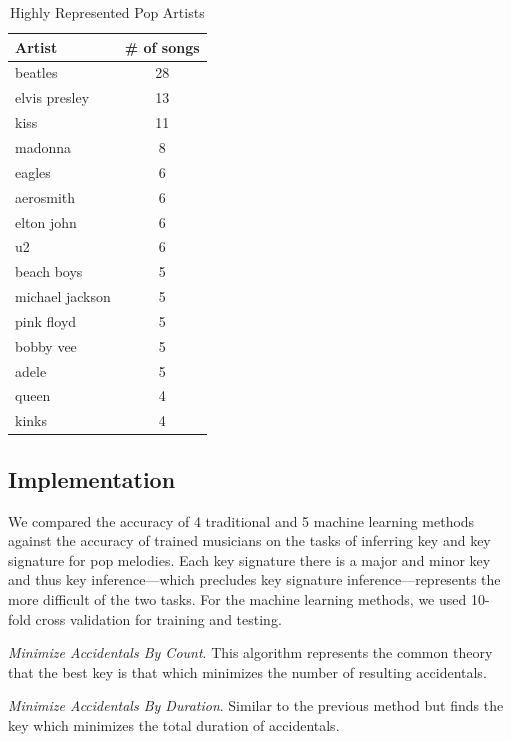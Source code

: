 \documentclass[letterpaper]{article}
\begin{document}
\begin{table}[]
\centering
\caption{Highly Represented Pop Artists}
\label{tab:data_summary}
\begin{tabular}{@{}lc@{}}
\toprule
Artist & \# of songs\\ \midrule
beatles	& 28 \\
elvis presley	& 13 \\
kiss	&	11 \\
madonna	&	8 \\
eagles	&	6 \\
aerosmith	&	6 \\
elton john	&	6 \\
u2	&	6 \\
beach boys	&	5 \\
michael jackson	&	5 \\
pink floyd	&	5 \\
bobby vee		&	5 \\
adele	&	5 \\
queen	&	4 \\
kinks		&	4 \\
\end{tabular}
\end{table}

\subsection{Implementation}

We compared the accuracy of 4 traditional and 5 machine learning methods against the accuracy of trained musicians on the tasks of inferring key and key signature for pop melodies. Each key signature there is a major and minor key and thus key inference---which precludes key signature inference---represents the more difficult of the two tasks. For the machine learning methods, we used 10-fold cross validation for training and testing.

\emph{Minimize Accidentals By Count}. This algorithm represents the common theory that the best key is that which minimizes the number of resulting accidentals.

\emph{Minimize Accidentals By Duration}. Similar to the previous method but finds the key which minimizes the total duration of accidentals.
\end{document}
